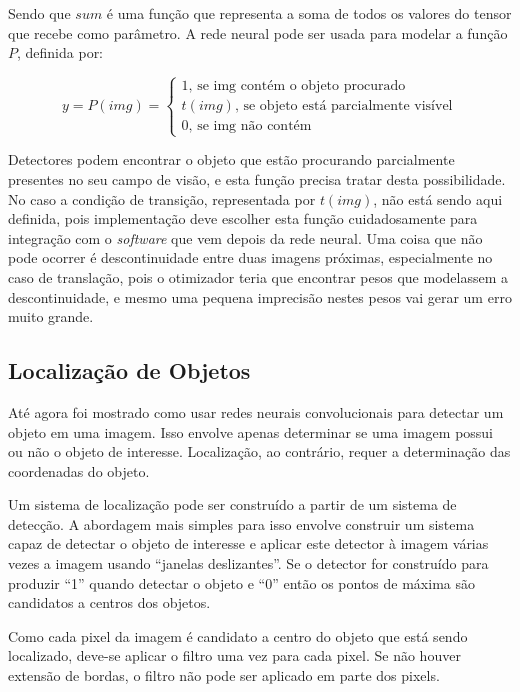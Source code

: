 Sendo que $sum$ é uma função que representa a soma de todos os valores do
tensor que recebe como parâmetro.
A rede neural pode ser usada para modelar a função $P$, definida por:

\begin{equation}
	y = P(img) = \begin{cases}
		1 \text{, se img contém o objeto procurado} \\
		t(img) \text{, se objeto está parcialmente visível} \\
		0 \text{, se img não contém}
	\end{cases}
\end{equation}

Detectores podem encontrar o objeto que estão procurando parcialmente presentes 
no seu campo de visão, e esta função precisa tratar desta possibilidade. No
caso a condição de transição, representada por $t(img)$, não está sendo
aqui definida, pois implementação deve escolher esta função cuidadosamente
para integração com o \emph{software} que vem depois da rede neural.
Uma coisa que não pode ocorrer é descontinuidade entre duas imagens próximas,
especialmente no caso de translação, pois o otimizador teria que encontrar
pesos que modelassem a descontinuidade, e mesmo uma pequena imprecisão nestes
pesos vai gerar um erro muito grande.

\subsection{Localização de Objetos} \label{sec:localiz_objetos}
Até agora foi mostrado como usar redes neurais convolucionais para detectar um
objeto em uma imagem. Isso envolve apenas determinar se uma imagem possui ou não
o objeto de interesse. Localização, ao contrário, requer a determinação das
coordenadas do objeto.

Um sistema de localização pode ser construído a partir de um sistema de
detecção. A abordagem mais simples para isso envolve construir um sistema capaz
de detectar o objeto de interesse e aplicar este
detector à imagem várias vezes a imagem usando ``janelas deslizantes''.
Se o detector for construído para produzir “1” quando detectar o objeto e
“0” então os pontos de máxima são candidatos a centros dos objetos.

Como cada pixel da imagem é candidato a centro do objeto que está sendo
localizado, deve-se aplicar o filtro uma vez para cada pixel. Se não houver
extensão de bordas, o filtro não pode ser aplicado em parte dos pixels.
